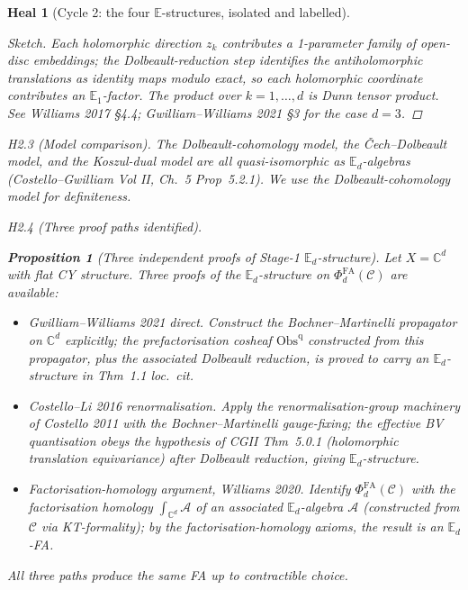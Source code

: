 \documentclass[11pt]{article}
\newtheorem{proposition}[theorem]{Proposition}
\newtheorem*{heal}{Heal}
\theoremstyle{definition}
\providecommand{\CC}{\mathbb{C}}
\providecommand{\cA}{\mathcal{A}}
\providecommand{\cC}{\mathcal{C}}
\providecommand{\Obs}{\mathrm{Obs}}
\providecommand{\FA}{\mathrm{FA}}
\begin{document}
\begin{heal}[Cycle 2: the four $\mathbb{E}$-structures, isolated and labelled]
\begin{proof}[Sketch]
Each holomorphic direction $z_k$ contributes a 1-parameter family of
open-disc embeddings; the Dolbeault-reduction step identifies the
antiholomorphic translations as identity maps modulo exact, so each
holomorphic coordinate contributes an $\mathbb{E}_1$-factor. The
product over $k = 1, \ldots, d$ is Dunn tensor product. See
Williams 2017 \S4.4; Gwilliam--Williams 2021 \S3 for the case $d=3$.
\end{proof}

\emph{H2.3 (Model comparison).} The Dolbeault-cohomology model, the
\v{C}ech--Dolbeault model, and the Koszul-dual model are all
quasi-isomorphic as $\mathbb{E}_d$-algebras (Costello--Gwilliam
Vol II, Ch.~5 Prop~5.2.1). We use the Dolbeault-cohomology model for
definiteness.

\emph{H2.4 (Three proof paths identified).}

\begin{proposition}[Three independent proofs of Stage-1 $\mathbb{E}_d$-structure]
\label{prop:three-proofs}
Let $X = \CC^d$ with flat CY structure. Three proofs of the
$\mathbb{E}_d$-structure on $\Phi^{\FA}_d(\cC)$ are available:
\begin{itemize}[leftmargin=2em]
  \item[(P1)] \emph{Gwilliam--Williams 2021 direct.} Construct the
              Bochner--Martinelli propagator on $\CC^d$ explicitly; the
              prefactorisation cosheaf $\Obs^{\mathrm{q}}$ constructed
              from this propagator, plus the associated Dolbeault
              reduction, is proved to carry an $\mathbb{E}_d$-structure
              in Thm~1.1 loc.~cit.
  \item[(P2)] \emph{Costello--Li 2016 renormalisation.} Apply the
              renormalisation-group machinery of Costello 2011 with
              the Bochner--Martinelli gauge-fixing; the effective BV
              quantisation obeys the hypothesis of CGII Thm~5.0.1
              (holomorphic translation equivariance) after Dolbeault
              reduction, giving $\mathbb{E}_d$-structure.
  \item[(P3)] \emph{Factorisation-homology argument, Williams 2020.}
              Identify $\Phi^{\FA}_d(\cC)$ with the factorisation
              homology $\int_{\CC^d} \cA$ of an associated
              $\mathbb{E}_d$-algebra $\cA$ (constructed from $\cC$ via
              KT-formality); by the factorisation-homology axioms, the
              result is an $\mathbb{E}_d$-FA.
\end{itemize}
All three paths produce the same FA up to contractible choice.
\end{proposition}
\end{heal}
\end{document}
